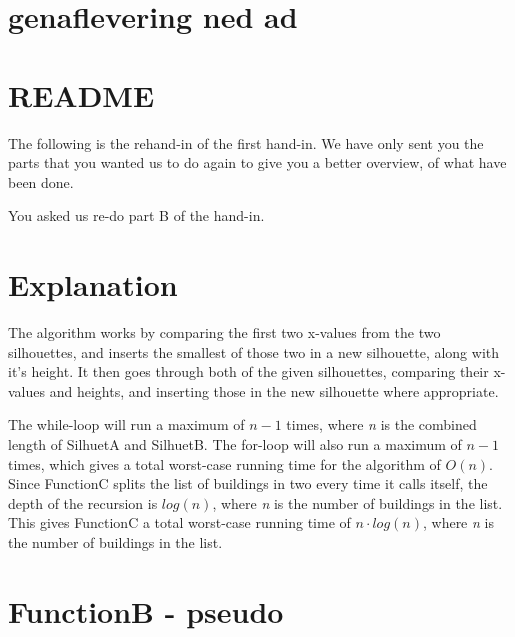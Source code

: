 \documentclass[a4paper,oneside,article,11pt]{memoir}
\begin{document}

\section*{genaflevering ned ad}

\section*{README}
The following is the rehand-in of the first hand-in.
We have only sent you the parts that you wanted us to do again to give you a better overview, of what have been done.

You asked us re-do part B of the hand-in.

\section*{Explanation}
The algorithm works by comparing the first two x-values from the two silhouettes, and inserts the smallest of those two in a new silhouette, along with it's height. It then goes through both of the given silhouettes, comparing their x-values and heights, and inserting those in the new silhouette where appropriate.

The while-loop will run a maximum of $n-1$ times, where \emph{n} is the combined length of SilhuetA and SilhuetB. The for-loop will also run a maximum of $n-1$ times, which gives a total worst-case running time for the algorithm of $O(n)$. Since FunctionC splits the list of buildings in two every time it calls itself, the depth of the recursion is $log(n)$, where \emph{n} is the number of buildings in the list. This gives FunctionC a total worst-case running time of $n \cdot log(n)$, where \emph{n} is the number of buildings in the list.


\newpage

\section*{FunctionB - pseudo}
\end{document}
